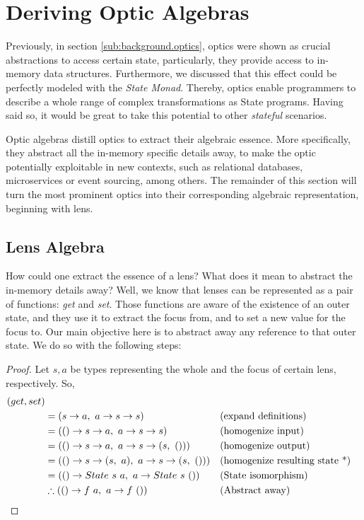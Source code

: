 \documentclass[a4paper]{article}
\begin{document}
\section{Deriving Optic Algebras}

Previously, in section \ref{sub:background.optics}, optics were shown as crucial
abstractions to access certain state, particularly, they provide access to
in-memory data structures. Furthermore, we discussed that this effect could be
perfectly modeled with the \emph{State Monad}. Thereby, optics enable
programmers to describe a whole range of complex transformations as State
programs. Having said so, it would be great to take this potential to other
\emph{stateful} scenarios.

Optic algebras distill optics to extract their algebraic essence. More
specifically, they abstract all the in-memory specific details away, to make the
optic potentially exploitable in new contexts, such as relational databases,
microservices or event sourcing, among others. The remainder of this section
will turn the most prominent optics into their corresponding algebraic
representation, beginning with lens.

\subsection{Lens Algebra}

How could one extract the essence of a lens? What does it mean to abstract the
in-memory details away? Well, we know that lenses can be represented as a pair
of functions: \emph{get} and \emph{set}. Those functions are aware of the
existence of an outer state, and they use it to extract the focus from, and to
set a new value for the focus to. Our main objective here is to abstract away
any reference to that outer state. We do so with the following steps:

\begin{proof}
  Let $s, a$ be types representing the whole and the focus of certain lens,
  respectively. So,
  \begin{align*}
    (get, set) \\
    &= (s \rightarrow a,\ a \rightarrow s \rightarrow s) &&\text{(expand definitions)} \\
    &= (() \rightarrow s \rightarrow a,\ a \rightarrow s \rightarrow s) &&\text{(homogenize input)} \\
    &= (() \rightarrow s \rightarrow a,\ a \rightarrow s \rightarrow (s,\ ())) &&\text{(homogenize output)} \\
    &= (() \rightarrow s \rightarrow (s,\ a),\ a \rightarrow s \rightarrow (s,\ ())) &&\text{(homogenize resulting state *)} \\
    &= (() \rightarrow State\ s\ a,\ a \rightarrow State\ s\ ()) &&\text{(State isomorphism)} \\
    &\therefore (() \rightarrow f\ a,\ a \rightarrow f\ ()) &&\text{(Abstract away)}\qedhere
  \end{align*}
\end{proof}
\end{document}

